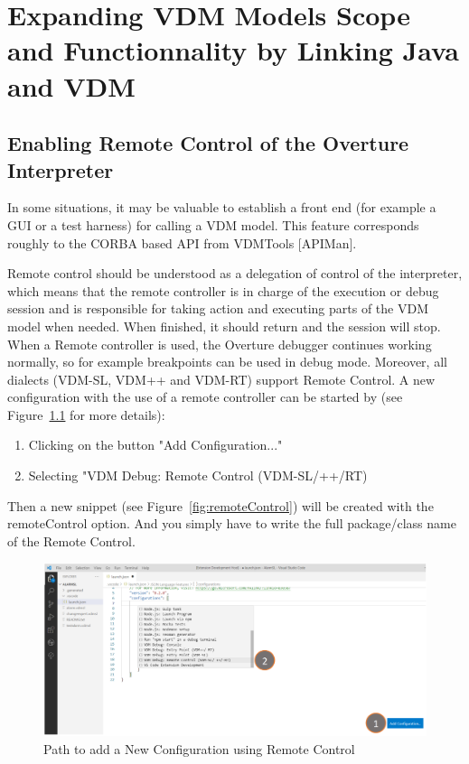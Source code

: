 \documentclass{overturerepchap}
\begin{document}
%
%


\chapter{Expanding VDM Models Scope and Functionnality by Linking Java and VDM}\label{sec:javaCombinesWithVDM}

\section{Enabling Remote Control of the Overture Interpreter}

In some situations, it may be valuable to establish a front end (for example a GUI or a test harness)
for calling a VDM model. This feature corresponds roughly to the CORBA based API from
VDMTools [APIMan].

Remote control should be understood as a delegation of control of the interpreter, which means that
the remote controller is in charge of the execution or debug session and is responsible for taking
action and executing parts of the VDM model when needed. When finished, it should return and
the session will stop. When a Remote controller is used, the Overture debugger continues working
normally, so for example breakpoints can be used in debug mode. Moreover, all dialects (VDM-SL, VDM++ and VDM-RT) support Remote Control. A new configuration with the
use of a remote controller can be started by (see Figure~\ref{fig:pathRemoteControl} for more details):
\begin{enumerate}
    \item Clicking on the button "Add Configuration..."
    \item Selecting "VDM Debug: Remote Control (VDM-SL/++/RT)
\end{enumerate}
Then a new snippet (see Figure~\ref{fig:remoteControl}) will be created with the remoteControl option. And you simply have to write the full package/class name of the Remote Control.

\begin{figure}[htbp]
\begin{center}
\includegraphics[width=16cm]{snapshots/Path Remote Control.png}
\caption{Path to add a New Configuration using Remote Control \label{fig:pathRemoteControl}}
\end{center}
\end{figure}
\end{document}
